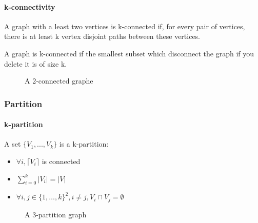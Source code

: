 \paragraph{k-connectivity}
A graph with a least two vertices is k-connected if, for every pair of vertices, there is at least k vertex disjoint paths between these vertices.

A graph is k-connected if the smallest subset which disconnect the graph if you delete it is of size k.

\begin{figure}[!h]
  \begin{center}
    
  \end{center}
  \caption{A 2-connected graphe}
\end{figure}

\subsubsection{Partition}
\paragraph{k-partition} A set $\{V_1,...,V_k\}$ is a k-partition:
\begin{itemize}
    \item $\forall i, \lceil V_i \rceil$ is connected
    \item $\sum\limits_{i=0}^k|V_i| = |V|$
    \item $\forall i,j \in \{1, \dots, k\}^2, i \neq j, V_i \cap V_j = \emptyset$
\end{itemize}

\begin{figure}
    \begin{center}
        
    \end{center}
    \caption{A 3-partition graph}
\end{figure}


